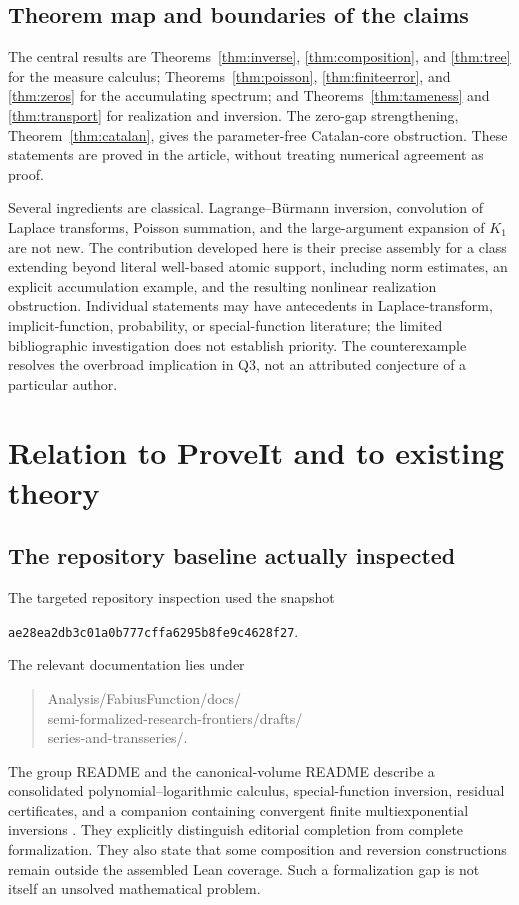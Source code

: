 \documentclass[11pt,a4paper]{article}
\theoremstyle{definition}
\theoremstyle{remark}
\newcommand{\code}[1]{\nolinkurl{#1}}
\numberwithin{equation}{section}
\begin{document}
\subsection{Theorem map and boundaries of the claims}
The central results are Theorems~\ref{thm:inverse}, \ref{thm:composition}, and \ref{thm:tree} for the measure calculus; Theorems~\ref{thm:poisson}, \ref{thm:finiteerror}, and \ref{thm:zeros} for the accumulating spectrum; and Theorems~\ref{thm:tameness} and \ref{thm:transport} for realization and inversion. The zero-gap strengthening, Theorem~\ref{thm:catalan}, gives the parameter-free Catalan-core obstruction. These statements are proved in the article, without treating numerical agreement as proof.

Several ingredients are classical. Lagrange--B\"urmann inversion, convolution of Laplace transforms, Poisson summation, and the large-argument expansion of $K_1$ are not new. The contribution developed here is their precise assembly for a class extending beyond literal well-based atomic support, including norm estimates, an explicit accumulation example, and the resulting nonlinear realization obstruction. Individual statements may have antecedents in Laplace-transform, implicit-function, probability, or special-function literature; the limited bibliographic investigation does not establish priority. The counterexample resolves the overbroad implication in Q3, not an attributed conjecture of a particular author.

\section{Relation to ProveIt and to existing theory}\label{sec:repo}

\subsection{The repository baseline actually inspected}
The targeted repository inspection used the snapshot
\begin{center}
\small\code{ae28ea2db3c01a0b777cffa6295b8fe9c4628f27}.
\end{center}
The relevant documentation lies under
\begin{quote}\small\ttfamily
Analysis/FabiusFunction/docs/\\
semi-formalized-research-frontiers/drafts/\\
series-and-transseries/.
\end{quote}
The group README and the canonical-volume README describe a consolidated polynomial--logarithmic calculus, special-function inversion, residual certificates, and a companion containing convergent finite multiexponential inversions \cite{repo-group,repo-main}. They explicitly distinguish editorial completion from complete formalization. They also state that some composition and reversion constructions remain outside the assembled Lean coverage. Such a formalization gap is not itself an unsolved mathematical problem.
\end{document}
